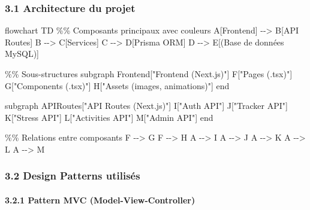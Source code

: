 \documentclass[
]{article}
\newenvironment{Shaded}{}{}
\newcommand{\NormalTok}[1]{#1}
\begin{document}
\subsubsection{3.1 Architecture du projet}\label{architecture-du-projet}

\begin{Shaded}
\begin{Highlighting}[]
\NormalTok{flowchart TD}
\NormalTok{    \%\% Composants principaux avec couleurs}
\NormalTok{    A[Frontend] {-}{-}\textgreater{} B[API Routes]}
\NormalTok{    B {-}{-}\textgreater{} C[Services]}
\NormalTok{    C {-}{-}\textgreater{} D[Prisma ORM]}
\NormalTok{    D {-}{-}\textgreater{} E[(Base de données MySQL)]}
    
\NormalTok{    \%\% Sous{-}structures}
\NormalTok{    subgraph Frontend["Frontend (Next.js)"]}
\NormalTok{        F["Pages (.tsx)"]}
\NormalTok{        G["Components (.tsx)"]}
\NormalTok{        H["Assets (images, animations)"]}
\NormalTok{    end}
    
\NormalTok{    subgraph APIRoutes["API Routes (Next.js)"]}
\NormalTok{        I["Auth API"]}
\NormalTok{        J["Tracker API"]}
\NormalTok{        K["Stress API"]}
\NormalTok{        L["Activities API"]}
\NormalTok{        M["Admin API"]}
\NormalTok{    end}
    
\NormalTok{    \%\% Relations entre composants}
\NormalTok{    F {-}{-}\textgreater{} G}
\NormalTok{    F {-}{-}\textgreater{} H}
\NormalTok{    A {-}{-}\textgreater{} I}
\NormalTok{    A {-}{-}\textgreater{} J}
\NormalTok{    A {-}{-}\textgreater{} K}
\NormalTok{    A {-}{-}\textgreater{} L}
\NormalTok{    A {-}{-}\textgreater{} M}
\end{Highlighting}
\end{Shaded}

\subsubsection{3.2 Design Patterns
utilisés}\label{design-patterns-utilisuxe9s}

\paragraph{3.2.1 Pattern MVC
(Model-View-Controller)}\label{pattern-mvc-model-view-controller}
\end{document}
